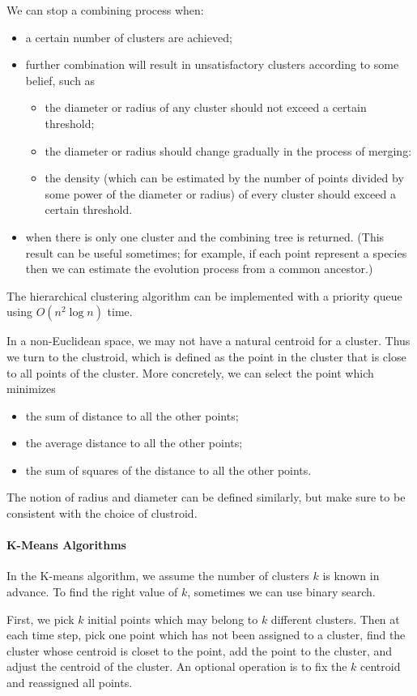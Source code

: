 \documentclass{article}
\begin{document}
We can stop a combining process when:
\begin{itemize}
\item a certain number of clusters are achieved;
\item further combination will result in unsatisfactory clusters according to some belief, such as
\begin{itemize}
\item the diameter or radius of any cluster should not exceed a certain threshold;
\item the diameter or radius should change gradually in the process of merging:
\item the density (which can be estimated by the number of points divided by some power of the diameter or radius) of every cluster should exceed a certain threshold.
\end{itemize}
\item when there is only one cluster and the combining tree is returned. (This result can be useful sometimes; for example, if each point represent a species then we can estimate the evolution process from a common ancestor.)
\end{itemize}

The hierarchical clustering algorithm can be implemented with a priority queue using $O(n^2\log n)$ time.

In a non-Euclidean space, we may not have a natural centroid for a cluster. Thus we turn to the clustroid, which is defined as the point in the cluster that is close to all points of the cluster. More concretely, we can select the point which minimizes
\begin{itemize}
\item the sum of distance to all the other points;
\item the average distance to all the other points;
\item the sum of squares of the distance to all the other points.
\end{itemize}
The notion of radius and diameter can be defined similarly, but make sure to be consistent with the choice of clustroid.

\paragraph*{K-Means Algorithms}
In the K-means algorithm, we assume the number of clusters $k$ is known in advance. To find the right value of $k$, sometimes we can use binary search.

First, we pick $k$ initial points which may belong to $k$ different clusters. Then at each time step, pick one point which has not been assigned to a cluster, find the cluster whose centroid is closet to the point, add the point to the cluster, and adjust the centroid of the cluster. An optional operation is to fix the $k$ centroid and reassigned all points.
\end{document}
